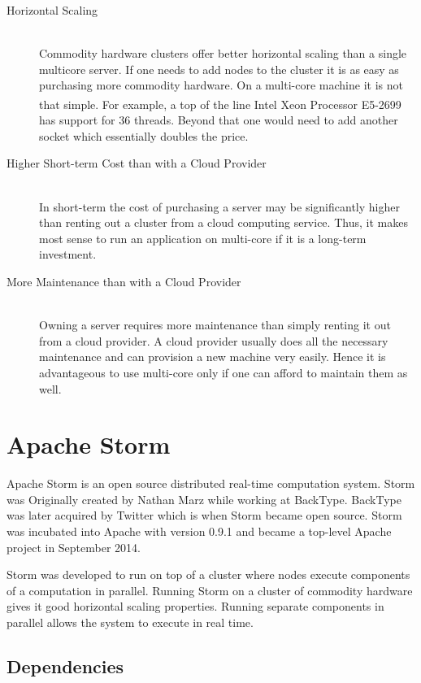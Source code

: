 \begin{description}
	\item[Horizontal Scaling] \hfill \\
	Commodity hardware clusters offer better horizontal scaling than a single multicore server. If one needs to add nodes to the cluster it is as easy as purchasing more commodity hardware. On a multi-core machine it is not that simple. For example, a top of the line Intel\textsuperscript{\textregistered} Xeon\textsuperscript{\textregistered} Processor E5-2699 has support for 36 threads. Beyond that one would need to add another socket which essentially doubles the price.
	\item[Higher Short-term Cost than with a Cloud Provider] \hfill \\
	In short-term the cost of purchasing a server may be significantly higher than renting out a cluster from a cloud computing service. Thus, it makes most sense to run an application on multi-core if it is a long-term investment.
	\item[More Maintenance than with a Cloud Provider] \hfill \\
	Owning a server requires more maintenance than simply renting it out from a cloud provider. A cloud provider usually does  all the necessary maintenance and can provision a new machine very easily. Hence it is advantageous to use multi-core only if one can afford to maintain them as well.
\end{description}

\section{Apache Storm}
\label{sec:apache_storm}

Apache Storm is an open source distributed real-time computation system. Storm was Originally created by Nathan Marz while working at BackType. \cite{NathanAbout} BackType was later acquired by Twitter which is when Storm became open source. Storm was incubated into Apache with version 0.9.1 and became a top-level Apache project in September 2014.

Storm was developed to run on top of a cluster where nodes execute components of a computation in parallel. Running Storm on a cluster of commodity hardware gives it good horizontal scaling properties. Running separate components in parallel allows the system to execute in real time.

\subsection{Dependencies}

